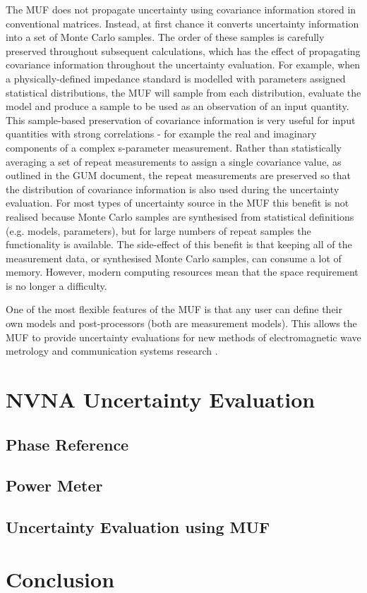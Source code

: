 \documentclass[../thesis/thesis.tex]{subfiles}
\begin{document}
\begin{refsection}
The MUF does not propagate uncertainty using covariance information stored in conventional matrices. Instead, at first chance it converts uncertainty information into a set of Monte Carlo samples. The order of these samples is carefully preserved throughout subsequent calculations, which has the effect of propagating covariance information throughout the uncertainty evaluation. For example, when a physically-defined impedance standard is modelled with parameters assigned statistical distributions, the MUF will sample from each distribution, evaluate the model and produce a sample to be used as an observation of an input quantity. This sample-based preservation of covariance information is very useful for input quantities with strong correlations - for example the real and imaginary components of a complex s-parameter measurement. Rather than statistically averaging a set of repeat measurements to assign a single covariance value, as outlined in the GUM document, the repeat measurements are preserved so that the distribution of covariance information is also used during the uncertainty evaluation. For most types of uncertainty source in the MUF this benefit is not realised because Monte Carlo samples are synthesised from statistical definitions (e.g. models, parameters), but for large numbers of repeat samples the functionality is available. The side-effect of this benefit is that keeping all of the measurement data, or synthesised Monte Carlo samples, can consume a lot of memory. However, modern computing resources mean that the space requirement is no longer a difficulty.

One of the most flexible features of the MUF is that any user can define their own models and post-processors (both are measurement models). This allows the MUF to provide uncertainty evaluations for new methods of electromagnetic wave metrology and communication systems research \cite{Dortmans_2019, Sanders_2019}.

\section{NVNA Uncertainty Evaluation}
\subsection{Phase Reference}
\subsection{Power Meter}
\subsection{Uncertainty Evaluation using MUF}
\section{Conclusion}
\printbibliography[title=References]
\end{refsection}
\end{document}
